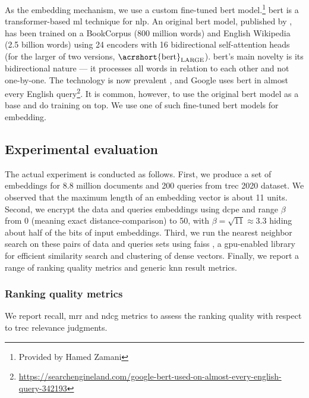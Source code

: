			As the embedding mechanism, we use a custom fine-tuned \acrshort{bert} model.\footnote{Provided by Hamed Zamani}
			\acrfull{bert} is a transformer-based \acrshort{ml} technique for \acrlong{nlp}.
			An original \acrshort{bert} model, published by \textcite{bert}, has been trained on a BookCorpus \cite{bookcorpus} (800 million words) and English Wikipedia (2.5 billion words) using 24 encoders with 16 bidirectional self-attention heads (for the larger of two versions, $\text{\acrshort{bert}}_\text{LARGE}$).
			\acrshort{bert}'s main novelty is its bidirectional nature --- it processes all words in relation to each other and not one-by-one.
			The technology is now prevalent \cite{bert-is-prevalent}, and Google uses \acrshort{bert} in almost every English query\footnote{
				\url{https://searchengineland.com/google-bert-used-on-almost-every-english-query-342193}
			}.
			It is common, however, to use the original \acrshort{bert} model as a base and do training on top.
			{\color{red}We use one of such fine-tuned \acrshort{bert} models for embedding.}

		\subsection{Experimental evaluation}

			The actual experiment is conducted as follows.
			First, we produce a set of embeddings for 8.8 million documents and 200 queries from \acrshort{trec} 2020 dataset.
			We observed that the maximum length of an embedding vector is about 11 units.
			Second, we encrypt the data and queries embeddings using \acrshort{dcpe} and range $\beta$ from 0 (meaning exact distance-comparison) to 50, with $\beta = \sqrt{11} \approx 3.3$ hiding about half of the bits of input embeddings.
			Third, we run the nearest neighbor search on these pairs of data and queries sets using \acrshort{faiss} \cite{faiss}, a \acrshort{gpu}-enabled library for efficient similarity search and clustering of dense vectors.
			Finally, we report a range of ranking quality metrics and generic \acrshort{knn} result metrics.

			\subsubsection{Ranking quality metrics}

				We report recall, \acrfull{mrr} \cite{mrr} and \acrfull{ndcg} \cite{dcg} metrics to assess the ranking quality with respect to \acrshort{trec} relevance judgments.

